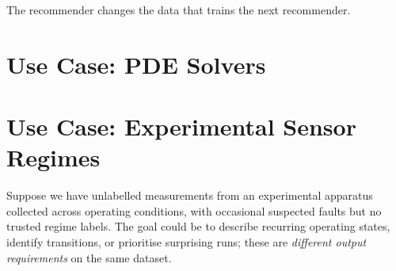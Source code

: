 \begin{calloutmemoryhook}
The recommender changes the data that trains the next recommender.
\end{calloutmemoryhook}

\section{Use Case: PDE Solvers}
\label{chap:usecase_pde_solvers}

\section{Use Case: Experimental Sensor Regimes}
\label{sec:sensors}
Suppose we have unlabelled measurements from an experimental apparatus collected across operating conditions, with occasional suspected faults but no trusted regime labels.
The goal could be to describe recurring operating states, identify transitions, or prioritise surprising runs; these are \emph{different output requirements} on the same dataset.

\begin{center}
    \caption{The clustering algorithm is only one stage: feature construction and validation determine whether its structure is meaningful.}
    \label{fig:pipeline}
\end{center}

